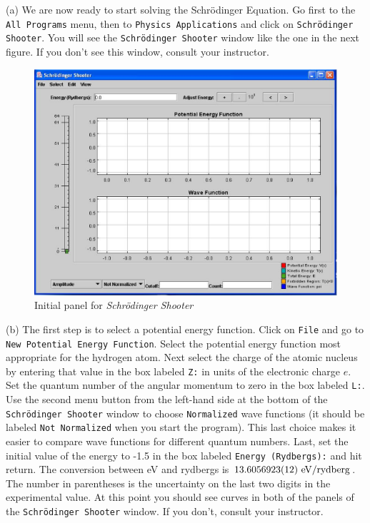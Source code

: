 (a) We are now ready to start solving the Schr\"odinger Equation.
Go first to the {\tt All Programs} menu, then
to {\tt Physics Applications} and click on {\tt Schr\"odinger Shooter}.
You will see the {\tt Schr\"odinger Shooter} window like the one in the next figure.
If you don't see this window, consult your instructor.
\begin{figure}[hbt]
\begin{center}
\includegraphics[width=6.0in]{solveSE/shooter1b.eps}
\caption{Initial panel for {\it Schr\"odinger Shooter}}
\end{center}
\end{figure}

(b) The first step is to select a potential energy function.
Click on {\tt File} and go to {\tt New Potential Energy Function}.
Select the potential energy function most appropriate for the hydrogen atom.
Next select the charge of the atomic nucleus by entering that value in the 
box labeled {\tt Z:} in units of the electronic charge $e$.
Set the quantum number of the angular momentum to zero in the box
labeled {\tt L:}.
Use the second menu button from the left-hand side 
at the bottom of the {\tt Schr\"odinger Shooter}
window to choose {\tt Normalized} wave functions (it should be labeled {\tt Not Normalized}
when you start the program).
This last choice makes it easier to compare wave functions for different quantum numbers.
Last, set the initial value of the energy to -1.5 in the box labeled 
{\tt Energy (Rydbergs):} and hit return.
The conversion between eV and rydbergs is $\rm 13.605 6923(12)~ eV/rydberg$.
The number in parentheses is the uncertainty on the last two digits in the
experimental value.
At this point you should see curves in both of the panels of the 
{\tt Schr\"odinger Shooter} window.
If you don't, consult your instructor.

